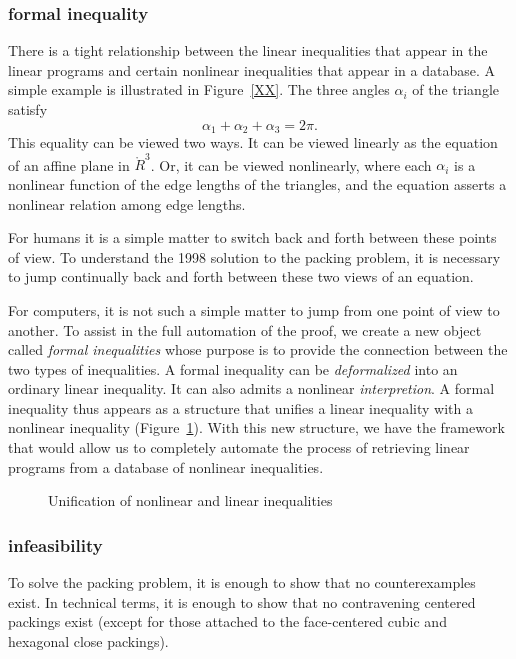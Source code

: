 \subsubsection{formal inequality}

There is a tight relationship between the linear inequalities that
appear in the linear programs and certain nonlinear inequalities
that appear in a database.  A simple example is illustrated in
Figure~\ref{XX}.  The three angles $\alpha_i$ of the triangle
satisfy
    \begin{equation}
    \label{eqn:2pi}
    \alpha_1 + \alpha_2 + \alpha_3 = 2\pi.
    \end{equation}
This equality can be viewed two ways.  It can be viewed linearly
as the equation of an affine plane in $\ring{R}^3$.  Or, it can be
viewed nonlinearly, where each $\alpha_i$ is a nonlinear function
of the edge lengths of the triangles, and the equation asserts a
nonlinear relation among edge lengths.

For humans it is a simple matter to switch back and forth between
these points of view.  To understand the 1998 solution to the 
packing problem, it is necessary to jump continually back and forth
between these two views of an equation.

For computers, it is not such a simple matter to jump from one
point of view to another.  To assist in the full automation of the
proof, we create a new object called {\it formal inequalities}
whose purpose is to provide the connection between the two types
of inequalities.  A formal inequality can be {\it deformalized}
into an ordinary linear inequality.  It can also admits a
nonlinear {\it interpretion}.  A formal inequality thus appears as
a structure that unifies a linear inequality with a nonlinear
inequality (Figure~\ref{fig:formal}). With this new structure, we
have the framework that would allow us to completely automate the
process of retrieving linear programs from a database of nonlinear
inequalities.

\begin{figure}[htb]
  \centering
  \caption{Unification of nonlinear and linear inequalities}
  \label{fig:formal}
\end{figure}

\subsubsection{infeasibility}

To solve the packing problem, it is enough to show that no
counterexamples exist.  In technical terms, it is enough to show
that no contravening centered packings exist (except for those
attached to the face-centered cubic and hexagonal close packings).

